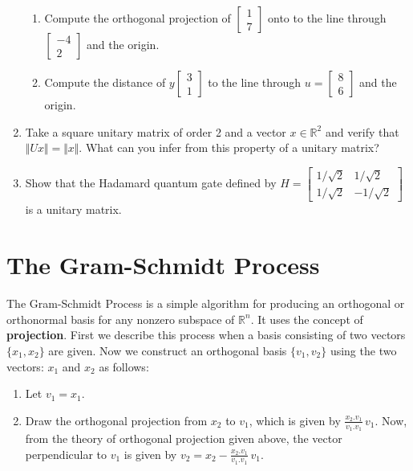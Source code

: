\documentclass[aima104_lecturenotes_ku.tex]{subfiles}
\begin{document}
\begin{enumerate}
\begin{enumerate}
  \item Compute the orthogonal projection of $
    \begin{bmatrix}
      1 \\ 7
    \end{bmatrix}
    $ onto to the line through $
    \begin{bmatrix}
      -4 \\ 2
    \end{bmatrix}
    $ and the origin.

  \item Compute the distance of $ y
    \begin{bmatrix}
      3 \\ 1
    \end{bmatrix}
    $ to the line through
    $u= \begin{bmatrix}
      8 \\ 6
    \end{bmatrix}
    $ and the origin.
  \end{enumerate}
\item Take a square unitary matrix of order 2 and a vector $x \in \mathbb{R}^2$ and verify that \\ $\Vert Ux \Vert = \Vert x \Vert$. What can you infer from this property of a unitary matrix?

 \item Show that the Hadamard quantum gate defined by $H =
   \begin{bmatrix}
     1/\sqrt{2} & 1/\sqrt{2} \\[1mm]
     1/\sqrt{2} & -1/\sqrt{2}
   \end{bmatrix}
   $ is a unitary matrix.
 \end{enumerate}

 \section{The Gram-Schmidt Process}
 The Gram-Schmidt Process is a simple algorithm for producing an orthogonal or orthonormal basis for any nonzero subspace of $\mathbb{R}^n$. It uses the concept of \textbf{projection}. First we describe this process when a basis consisting of two vectors $\{x_1,x_2\}$ are given. Now we construct an orthogonal basis $\{v_1, v_2\}$ using the two vectors: $x_1$ and $x_2$ as follows:
 \begin{enumerate}
 \item Let $v_1 = x_1$.
  \item Draw the orthogonal projection from $x_2$ to $v_1$, which is given by $\displaystyle \frac{x_2.v_1}{v_1.v_1} \, v_1$. Now, from the theory of orthogonal projection given above, the vector perpendicular to $v_1$ is given by $\displaystyle v_2 = x_2 - \frac{x_2.v_1}{v_1.v_1} \, v_1$.
 \end{enumerate}
\end{document}
